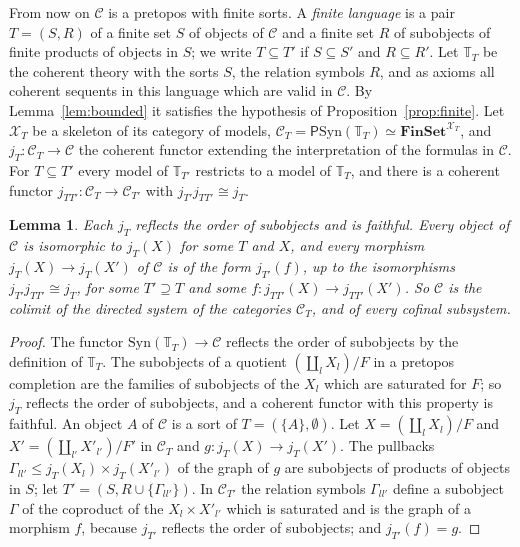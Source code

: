 \documentclass[11pt]{amsart}
\newtheorem{lem}[thm]{Lemma}
\theoremstyle{definition}
\newcommand{\Fin}{\mathbf{FinSet}}
\newcommand{\Syn}{\mathrm{Syn}}
\newcommand{\PP}{\mathsf P}
\newcommand{\cX}{\mathcal X}
\newcommand{\cC}{\mathcal C}
\newcommand{\bT}{\mathbb T}
\begin{document}
From now on $\cC$ is a pretopos with finite sorts. A \emph{finite
language} is a pair $T=(S,R)$ of a finite set $S$ of objects of $\cC$
and a finite set $R$ of subobjects of finite products of objects in
$S$; we write $T\subseteq T'$ if $S\subseteq S'$ and $R\subseteq R'$.
Let $\bT_T$ be the coherent theory with the sorts $S$, the relation
symbols $R$, and as axioms all coherent sequents in this language
which are valid in $\cC$. By Lemma~\ref{lem:bounded} it satisfies the
hypothesis of Proposition~\ref{prop:finite}. Let $\cX_T$ be a
skeleton of its category of models, $\cC_T=\PP\Syn(\bT_T)\simeq
\Fin^{\cX_T}$, and $j_T\colon\cC_T\to\cC$ the coherent functor
extending the interpretation of the formulas in $\cC$. For $T\subseteq
T'$ every model of $\bT_{T'}$ restricts to a model of $\bT_T$, and
there is a coherent functor $j_{TT'}\colon\cC_T\to\cC_{T'}$ with
$j_{T'}j_{TT'}\cong j_T$.

\begin{lem}\label{lem:union}
Each $j_T$ reflects the order of subobjects and is faithful. Every
object of $\cC$ is isomorphic to $j_T(X)$ for some $T$ and $X$, and
every morphism $j_T(X)\to j_T(X')$ of $\cC$ is of the form
$j_{T'}(f)$, up to the isomorphisms $j_{T'}j_{TT'}\cong j_T$, for some
$T'\supseteq T$ and some $f\colon j_{TT'}(X)\to j_{TT'}(X')$. So $\cC$
is the colimit of the directed system of the categories $\cC_T$, and
of every cofinal subsystem.
\end{lem}
\begin{proof}
The functor $\Syn(\bT_T)\to\cC$ reflects the order of subobjects by
the definition of $\bT_T$. The subobjects of a quotient $(\coprod_lX_l)
/F$ in a pretopos completion are the families of subobjects of the
$X_l$ which are saturated for $F$; so $j_T$ reflects the order of
subobjects, and a coherent functor with this property is faithful. An
object $A$ of $\cC$ is a sort of $T=(\{A\},\emptyset)$. Let $X=
(\coprod_lX_l)/F$ and $X'=(\coprod_{l'}X'_{l'})/F'$ in $\cC_T$ and
$g\colon j_T(X)\to j_T(X')$. The pullbacks $\Gamma_{ll'}\le j_T(X_l)
\times j_T(X'_{l'})$ of the graph of $g$ are subobjects of products of
objects in $S$; let $T'=(S,R\cup\{\Gamma_{ll'}\})$. In $\cC_{T'}$ the
relation symbols $\Gamma_{ll'}$ define a subobject $\Gamma$ of the
coproduct of the $X_l\times X'_{l'}$ which is saturated and is the
graph of a morphism $f$, because $j_{T'}$ reflects the order of
subobjects; and $j_{T'}(f)=g$.
\end{proof}
\end{document}
